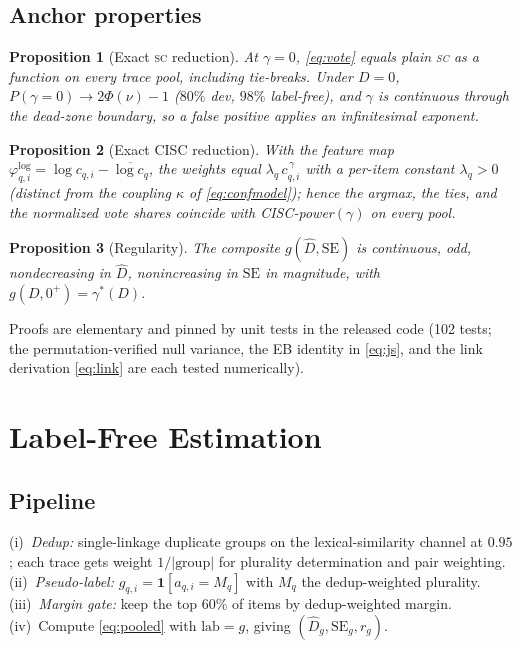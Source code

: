 \documentclass[conference]{IEEEtran}
\newtheorem{proposition}{Proposition}
\newcommand{\Dhat}{\widehat{D}}
\newcommand{\SC}{\textsc{sc}}
\begin{document}
\subsection{Anchor properties}
\begin{proposition}[Exact \SC{} reduction]\label{prop:sc}
At $\gamma=0$, \eqref{eq:vote} equals plain \SC{} as a function on every trace pool, including tie-breaks. Under $D=0$, $P(\gamma=0)\to 2\Phi(\nu)-1$ ($80\%$ dev, $98\%$ label-free), and $\gamma$ is continuous through the dead-zone boundary, so a false positive applies an infinitesimal exponent.
\end{proposition}
\begin{proposition}[Exact CISC reduction]\label{prop:cisc}
With the feature map $\varphi^{\log}_{q,i}=\log c_{q,i}-\overline{\log c_q}$, the weights equal $\lambda_q\,c_{q,i}^{\,\gamma}$ with a per-item constant $\lambda_q>0$ (distinct from the coupling $\kappa$ of \eqref{eq:confmodel}); hence the argmax, the ties, and the normalized vote shares coincide with CISC-power$(\gamma)$ on every pool.
\end{proposition}
\begin{proposition}[Regularity]\label{prop:reg}
The composite $g(\Dhat,\mathrm{SE})$ is continuous, odd, nondecreasing in $\Dhat$, nonincreasing in $\mathrm{SE}$ in magnitude, with $g(D,0^+)=\gamma^\ast(D)$.
\end{proposition}
Proofs are elementary and pinned by unit tests in the released code (102 tests; the permutation-verified null variance, the EB identity in \eqref{eq:js}, and the link derivation \eqref{eq:link} are each tested numerically).

\section{Label-Free Estimation}\label{sec:lf}

\subsection{Pipeline}
(i)~\emph{Dedup:} single-linkage duplicate groups on the lexical-similarity channel at $0.95$; each trace gets weight $1/|\text{group}|$ for plurality determination and pair weighting. (ii)~\emph{Pseudo-label:} $g_{q,i}=\mathbf{1}[a_{q,i}=M_q]$ with $M_q$ the dedup-weighted plurality. (iii)~\emph{Margin gate:} keep the top $60\%$ of items by dedup-weighted margin. (iv)~Compute \eqref{eq:pooled} with $\mathrm{lab}=g$, giving $(\Dhat_g,\mathrm{SE}_g,r_g)$.
\end{document}
